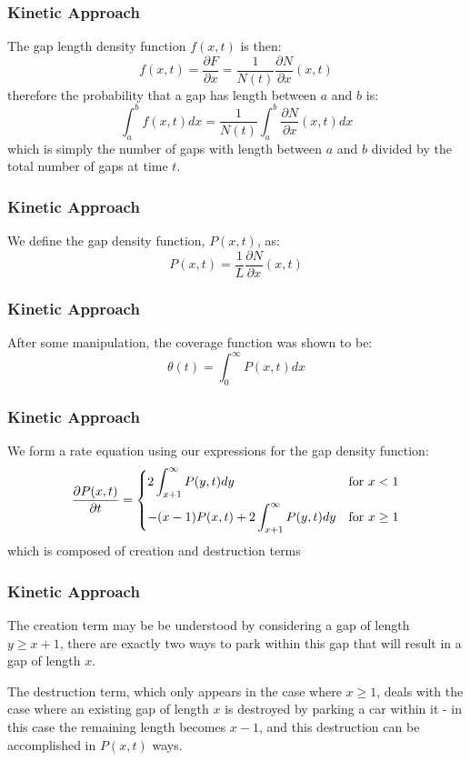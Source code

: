 \documentclass{beamer}
\begin{document}
\begin{frame}
	\frametitle{Kinetic Approach}
	The gap length density function $f(x, t)$ is then:
	\[
		f(x, t) = \frac{\partial F}{\partial x} = \frac{1}{N(t)} \frac{\partial N}{\partial x} (x, t)
	\]
	therefore the probability that a gap has length between $a$ and $b$ is:
	\[
		\int_{a}^{b} f(x, t) dx = \frac{1}{N(t)} \int_{a}^{b} \frac{\partial N}{\partial x} (x, t) dx
	\]
	which is simply the number of gaps with length between $a$ and $b$ 
	divided by the total number of gaps at time $t$.
\end{frame}

\begin{frame}
	\frametitle{Kinetic Approach}
	We define the gap density function, $P(x, t)$, as:
	\[
		P(x, t) = \frac{1}{L} \frac{\partial N}{\partial x} (x, t)
	\]
\end{frame}

\begin{frame}
	\frametitle{Kinetic Approach}
	After some manipulation, the coverage function was shown to be:
	\[
		\theta(t) = \int_{0}^{\infty} P(x, t) dx
	\]
\end{frame}

\begin{frame}
	\frametitle{Kinetic Approach}
	We form a rate equation using our expressions for the gap density function: 
	\begin{eqnarray*}
		\frac{\partial P(x, t)}{\partial t} = 
		\begin{dcases}
			2 \int_{x + 1}^{\infty} P(y, t) dy                     & \text{for } x < 1 \\
			-(x - 1) P(x, t) + 2 \int_{x + 1}^{\infty} P(y, t) dy  & \text{for } x \geq 1
		\end{dcases}
	\end{eqnarray*}
	which is composed of creation and destruction terms
\end{frame}

\begin{frame}
	\frametitle{Kinetic Approach}
	The creation term may be be understood by considering a gap of length $y \geq x + 1$, 
	there are exactly two ways to park within this gap that will result in a gap of length $x$. 

	The destruction term, which only appears in the case where $x \geq 1$, deals with 
	the case where an existing gap of length $x$ is destroyed by parking a car within 
	it - in this case the remaining length becomes $x - 1$, and this destruction can be 
	accomplished in $P(x, t)$ ways.
\end{frame}
\end{document}
